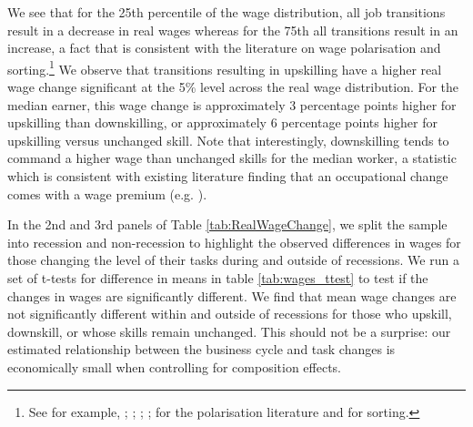 \documentclass[11pt, oneside]{article}
\begin{document}
	\vspace{2mm}
	
	We see that for the 25th percentile of the wage distribution, all job transitions result in a decrease in real wages whereas for the 75th all transitions result in an increase, a fact that is consistent with the literature on wage polarisation and sorting.\footnote{See for example, \cite{Autor2003}; \cite{Autor2008}; \cite{Goos2007}; \cite{Goos2009}; \cite{Cavaglia2017} for the polarisation literature and \cite{Groes2014} for sorting.} We observe that transitions resulting in upskilling have a higher real wage change significant at the 5\% level across the real wage distribution. For the median earner, this wage change is approximately 3 percentage points higher for upskilling than downskilling, or approximately 6 percentage points higher for upskilling versus unchanged skill. Note that interestingly, downskilling tends to command a higher wage than unchanged skills for the median worker, a statistic which is consistent with existing literature finding that an occupational change comes with a wage premium (e.g. \cite{Carrillo-Tudela2016}).
	
	\vspace{2mm}
	
	In the 2nd and 3rd panels of Table \ref{tab:RealWageChange}, we split the sample into recession and non-recession to highlight the observed differences in wages for those changing the level of their tasks during and outside of recessions. We run a set of t-tests for difference in means in table \ref{tab:wages_ttest} to test if the changes in wages are significantly different. We find that mean wage changes are not significantly different within and outside of recessions for those who upskill, downskill, or whose skills remain unchanged. This should not be a surprise: our estimated relationship between the business cycle and task changes is economically small when controlling for composition effects. 
	
	\newpage
	
	
	
\end{document}

